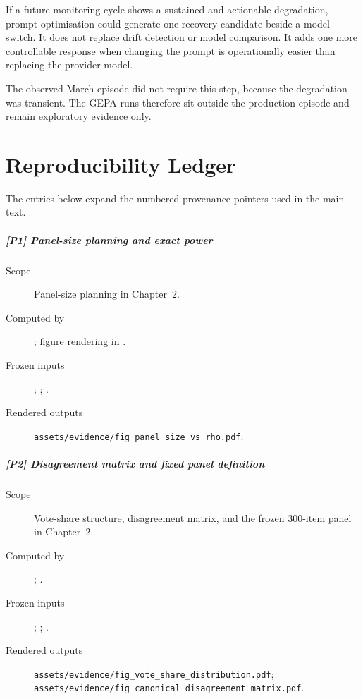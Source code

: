 If a future monitoring cycle shows a sustained and actionable degradation,
prompt optimisation could generate one recovery candidate beside a model switch.
It does not replace drift detection or model comparison. It adds one more
controllable response when changing the prompt is operationally easier than
replacing the provider model.

The observed March episode did not require this step, because the degradation
was transient. The GEPA runs therefore sit outside the production episode and
remain exploratory evidence only.

\chapter{Reproducibility Ledger}
\label{app:reproducibility-ledger}

The entries below expand the numbered provenance pointers used in the main text.

\begingroup
\small

\label{prov:P1}
\paragraph*{[P1] Panel-size planning and exact power}
\begin{description}
    \item[Scope] Panel-size planning in Chapter~2.
    \item[Computed by] ; figure rendering in .
    \item[Frozen inputs] ; ; .
    \item[Rendered outputs] \texttt{assets/evidence/fig\_panel\_size\_vs\_rho.pdf}.
\end{description}

\label{prov:P2}
\paragraph*{[P2] Disagreement matrix and fixed panel definition}
\begin{description}
    \item[Scope] Vote-share structure, disagreement matrix, and the frozen 300-item panel in Chapter~2.
    \item[Computed by] ; .
    \item[Frozen inputs] ; ; .
    \item[Rendered outputs] \texttt{assets/evidence/fig\_vote\_share\_distribution.pdf}; \texttt{assets/evidence/fig\_canonical\_disagreement\_matrix.pdf}.
\end{description}

